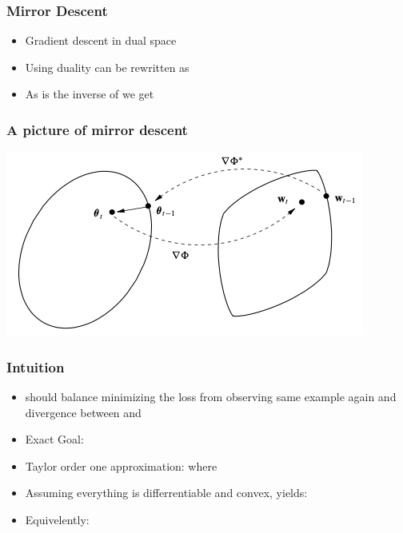 \documentclass[handout]{beamer}
\begin{document}
\begin{frame}
  \frametitle{Mirror Descent}
  \begin{itemize}
  \item Gradient descent in dual space
  \item Using duality can be rewritten as
  \item As \R{$\nabla \Phi$} is the inverse of \R{$\nabla \Phi^*$} we get
  \end{itemize}
\end{frame}

\begin{frame}
  \frametitle{A picture of mirror descent}
\includegraphics[width=\textwidth]{figures/MirrorDescent.png}
\end{frame}

\begin{frame}
  \frametitle{Intuition}
  \begin{itemize}
  \item \R{$\vu$} should balance minimizing the loss from observing same example again
    and divergence between \R{$\vu$} and 
  \item Exact Goal:
  \item Taylor order one approximation:
     where \\
    \item Assuming everything is differrentiable and convex,  yields:
    \item Equivelently: 
  \end{itemize}
\end{frame}
\end{document}
